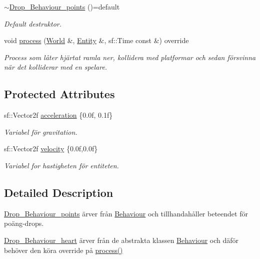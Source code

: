 \begin{DoxyCompactItemize}
\hyperlink{classDrop__Behaviour__points_a8522792b10aebe9d01dd84e87d42baad}{$\sim$\+Drop\+\_\+\+Behaviour\+\_\+points} ()=default
\begin{DoxyCompactList}\small\item\em Default destruktor. \end{DoxyCompactList}\item 
void \hyperlink{classDrop__Behaviour__points_a37b589ed4fe56c64b1c1b0bf3605e4ba}{process} (\hyperlink{classWorld}{World} \&, \hyperlink{classEntity}{Entity} \&, sf\+::\+Time const \&) override
\begin{DoxyCompactList}\small\item\em Process som låter hjärtat ramla ner, kollidera med platformar och sedan försvinna när det kolliderar med en spelare. \end{DoxyCompactList}\end{DoxyCompactItemize}
\subsection*{Protected Attributes}
\begin{DoxyCompactItemize}
\item 
sf\+::\+Vector2f \hyperlink{classBehaviour_ac17cf81ceee6a44e8a8ec6ee810c9fd3}{acceleration} \{0.\+0f, 0.\+1f\}
\begin{DoxyCompactList}\small\item\em Variabel för gravitation. \end{DoxyCompactList}\item 
sf\+::\+Vector2f \hyperlink{classBehaviour_a1d52096cf20a59890f7705acbaccf88a}{velocity} \{0.\+0f,0.\+0f\}
\begin{DoxyCompactList}\small\item\em Variabel for hastigheten för entiteten. \end{DoxyCompactList}\end{DoxyCompactItemize}


\subsection{Detailed Description}
\hyperlink{classDrop__Behaviour__points}{Drop\+\_\+\+Behaviour\+\_\+points} ärver från \hyperlink{classBehaviour}{Behaviour} och tillhandahåller beteendet för poäng-\/drops. 

\hyperlink{classDrop__Behaviour__heart}{Drop\+\_\+\+Behaviour\+\_\+heart} ärver från de abstrakta klassen \hyperlink{classBehaviour}{Behaviour} och däför behöver den köra override på \hyperlink{classDrop__Behaviour__points_a37b589ed4fe56c64b1c1b0bf3605e4ba}{process()} 

